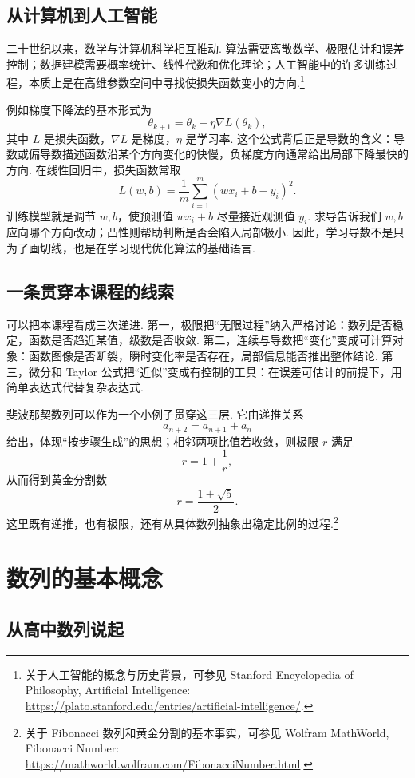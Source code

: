 \documentclass[fontset=fandol]{ctexart}
\begin{document}
\subsection{从计算机到人工智能}

二十世纪以来，数学与计算机科学相互推动. 算法需要离散数学、极限估计和误差控制；数据建模需要概率统计、线性代数和优化理论；人工智能中的许多训练过程，本质上是在高维参数空间中寻找使损失函数变小的方向.\footnote{关于人工智能的概念与历史背景，可参见 Stanford Encyclopedia of Philosophy, Artificial Intelligence: \url{https://plato.stanford.edu/entries/artificial-intelligence/}.}

例如梯度下降法的基本形式为
\[
\theta_{k+1}=\theta_k-\eta\nabla L(\theta_k),
\]
其中 $L$ 是损失函数，$\nabla L$ 是梯度，$\eta$ 是学习率. 这个公式背后正是导数的含义：导数或偏导数描述函数沿某个方向变化的快慢，负梯度方向通常给出局部下降最快的方向. 在线性回归中，损失函数常取
\[
L(w,b)=\frac1m\sum_{i=1}^m(wx_i+b-y_i)^2.
\]
训练模型就是调节 $w,b$，使预测值 $wx_i+b$ 尽量接近观测值 $y_i$. 求导告诉我们 $w,b$ 应向哪个方向改动；凸性则帮助判断是否会陷入局部极小. 因此，学习导数不是只为了画切线，也是在学习现代优化算法的基础语言.

\subsection{一条贯穿本课程的线索}

可以把本课程看成三次递进. 第一，极限把“无限过程”纳入严格讨论：数列是否稳定，函数是否趋近某值，级数是否收敛. 第二，连续与导数把“变化”变成可计算对象：函数图像是否断裂，瞬时变化率是否存在，局部信息能否推出整体结论. 第三，微分和 Taylor 公式把“近似”变成有控制的工具：在误差可估计的前提下，用简单表达式代替复杂表达式.

斐波那契数列可以作为一个小例子贯穿这三层. 它由递推关系
\[
a_{n+2}=a_{n+1}+a_n
\]
给出，体现“按步骤生成”的思想；相邻两项比值若收敛，则极限 $r$ 满足
\[
r=1+\frac1r,
\]
从而得到黄金分割数
\[
r=\frac{1+\sqrt5}{2}.
\]
这里既有递推，也有极限，还有从具体数列抽象出稳定比例的过程.\footnote{关于 Fibonacci 数列和黄金分割的基本事实，可参见 Wolfram MathWorld, Fibonacci Number: \url{https://mathworld.wolfram.com/FibonacciNumber.html}.}

\section{数列的基本概念}

\subsection{从高中数列说起}
\end{document}
